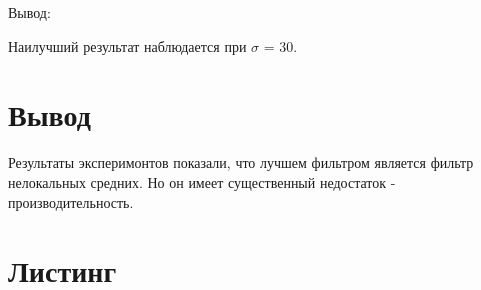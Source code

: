 Вывод:

Наилучший результат наблюдается при $\sigma$ = 30.

\section{Вывод}
Результаты эксперимонтов показали, что лучшем фильтром является фильтр нелокальных средних. Но он имеет существенный недостаток - производительность.

\vfill %

\section{Листинг}


\parindent=1cm


\parindent=1cm


\parindent=1cm


\parindent=1cm


